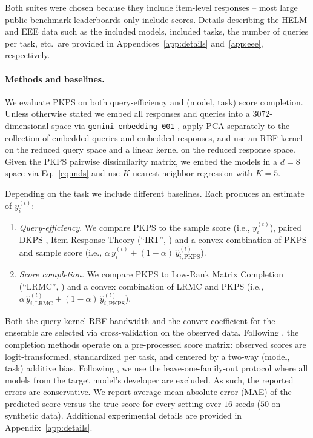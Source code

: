 \documentclass{article}
\theoremstyle{definition}
\theoremstyle{plain}
\newcommand{\PKPS}{PKPS\xspace}
\begin{document}
Both suites were chosen because they include item-level responses -- most large
public benchmark leaderboards only include scores.
Details describing the HELM and EEE data such as the included models, included
tasks, the number of queries per task, etc.\ are provided in
Appendices~\ref{app:details} and~\ref{app:eee}, respectively.

\paragraph{Methods and baselines.} We evaluate \PKPS on both query-efficiency and
(model, task) score completion.
Unless otherwise stated we embed all responses and queries into a $3072$-dimensional
space via \texttt{gemini-embedding-001} \citep{lee2025gemini}, apply PCA separately to the collection of embedded queries and embedded responses, and use an RBF kernel on the
reduced query space and a linear kernel on the reduced response space.
Given the \PKPS pairwise dissimilarity matrix, we embed the models in a $d = 8$ space
via Eq.~\eqref{eq:mds} and use $K$-nearest neighbor regression with $K = 5$.

Depending on the task we include different baselines. Each produces an estimate of
$y_{i}^{(t)}$:
\begin{enumerate}[wide, labelwidth=1pt, labelindent=12pt]
    \item \emph{Query-efficiency}. We compare \PKPS to the sample score (i.e.,
    $\tilde{y}_{i}^{(t)}$), paired DKPS \citep{dkps_qeff}, Item Response Theory
    (``IRT'', \citealp{polo2024tinybenchmarks}) and a convex combination
    of \PKPS and sample score (i.e.,
    $\alpha\,\tilde{y}_{i}^{(t)}+(1-\alpha)\,\hat{y}^{(t)}_{i,\mathrm{PKPS}}$).
    \item \emph{Score completion.} We compare \PKPS to Low-Rank Matrix Completion
    (``LRMC'', \citealp{benchpress}) and a convex combination of LRMC and \PKPS
    (i.e., $\alpha\,\hat{y}^{(t)}_{i,\mathrm{LRMC}}+(1-\alpha)\,\hat{y}^{(t)}_{i,\mathrm{PKPS}}$).
\end{enumerate}
Both the query kernel RBF bandwidth and the convex coefficient for the ensemble are
selected via cross-validation on the observed data.
Following \citet{benchpress}, the completion methods operate on a pre-processed score matrix:
observed scores are logit-transformed, standardized per task, and centered by a
two-way (model, task) additive bias.
Following \citet{dkps_qeff}, we use the leave-one-family-out protocol where all models from the
target model's developer are excluded. 
As such, the reported errors are conservative.
We report average mean absolute error (MAE) of the predicted score versus the true
score for every setting over $16$ seeds ($50$ on synthetic data).
Additional experimental details are provided in Appendix~\ref{app:details}.
\end{document}
